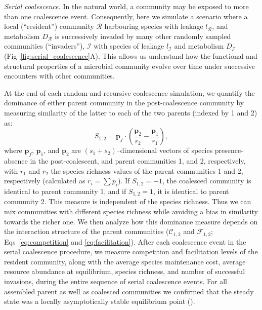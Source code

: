 \documentclass[10pt,letterpaper]{article}
\begin{document}
\hspace{-14pt}\textit{Serial coalescence.} In the natural world, a community may be exposed to more than one coalescence event. Consequently, here we simulate a scenario where a local (``resident'') community $\mathcal{R}$ harbouring species with leakage $l_{\mathcal{R}}$, and metabolism $D_{\mathcal{R}}$ is successively invaded by many other randomly sampled communities (``invaders''), $\mathcal{I}$ with species of leakage $l_{\mathcal{I}}$ and metabolism $D_{\mathcal{I}}$ (Fig~\ref{fig:serial_coalescence}A). This allows us understand how the functional and structural properties of a microbial community evolve over time under successive encounters with other communities.

At the end of each random and recursive coalescence simulation, we quantify the dominance of either parent community in the post-coalescence community by measuring similarity of the latter to each of the two parents (indexed by 1 and 2) as:
\begin{equation}\label{eq:similarity}
    S_{1,2} = \boldsymbol{p}_f\cdot\left(\dfrac{\boldsymbol{p}_2}{r_2}  - \dfrac{\boldsymbol{p}_1}{r_1}\right), 
\end{equation}
where $\boldsymbol{p}_f$, $\boldsymbol{p}_1$, and $\boldsymbol{p}_2$ are $(s_1 + s_2)$--dimensional vectors of species presence-absence in the post-coalescent, and parent communities 1, and 2, respectively, with $r_1$ and $r_2$ the species richness values of the parent communities 1 and 2, respectively (calculated as $r_i = \sum p_i$). If $S_{1,2} = -1$, the coalesced community is identical to parent community 1, and if $S_{1,2} = 1$, it is identical to parent community 2. This measure is independent of the species richness. Thus we can mix communities with different species richness while avoiding a bias in similarity towards the richer one. We then analyze how this dominance measure depends on the interaction structure of the parent communities ($\mathcal{C}_{1, 2}$ and $\mathcal{F}_{1, 2}$; Eqs~\ref{eq:competition} and \ref{eq:facilitation}). After each coalescence event in the serial coalescence procedure, we measure competition and facilitation levels of the resident community, along with the average species maintenance cost, average resource abundance at equilibrium, species richness, and number of successful invasions, during the entire sequence of serial coalescence events. For all assembled parent as well as coalesced communities we confirmed that the steady state was a locally asymptotically stable equilibrium point ().
\end{document}
